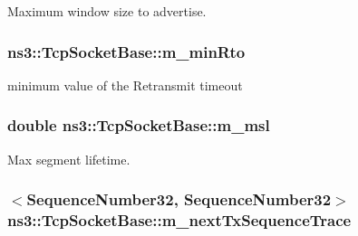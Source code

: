 Maximum window size to advertise. 

\subsubsection[{\texorpdfstring{m\+\_\+min\+Rto}{m_minRto}}]{ ns3\+::\+Tcp\+Socket\+Base\+::m\+\_\+min\+Rto\hspace{0.3cm}{\ttfamily [protected]}}\hypertarget{classns3_1_1TcpSocketBase_a0e95a7381ca2a157516e7f2e86455922}{}\label{classns3_1_1TcpSocketBase_a0e95a7381ca2a157516e7f2e86455922}


minimum value of the Retransmit timeout 

\subsubsection[{\texorpdfstring{m\+\_\+msl}{m_msl}}]{\setlength{\rightskip}{0pt plus 5cm}double ns3\+::\+Tcp\+Socket\+Base\+::m\+\_\+msl\hspace{0.3cm}{\ttfamily [protected]}}\hypertarget{classns3_1_1TcpSocketBase_a668a2cc5cf751511263ee8a0766c9ea5}{}\label{classns3_1_1TcpSocketBase_a668a2cc5cf751511263ee8a0766c9ea5}


Max segment lifetime. 

\subsubsection[{\texorpdfstring{m\+\_\+next\+Tx\+Sequence\+Trace}{m_nextTxSequenceTrace}}]{$<${\bf Sequence\+Number32}, {\bf Sequence\+Number32}$>$ ns3\+::\+Tcp\+Socket\+Base\+::m\+\_\+next\+Tx\+Sequence\+Trace}\hypertarget{classns3_1_1TcpSocketBase_a4f6e09e3f0132fbf82af53bcd9c49acc}{}\label{classns3_1_1TcpSocketBase_a4f6e09e3f0132fbf82af53bcd9c49acc}


